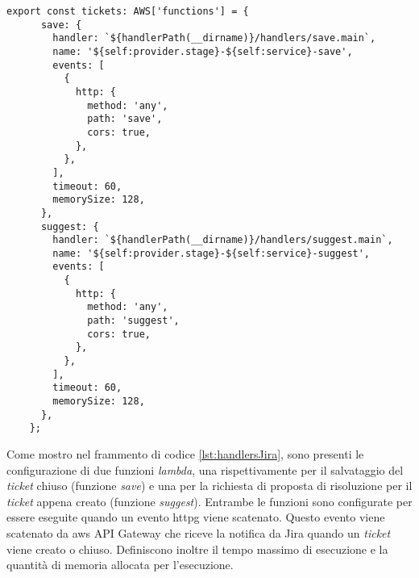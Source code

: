 \begin{lstlisting}[caption=Configurazione delle funzioni \textit{lambda} del sistema Jira in \textit{index.ts}, label=lst:handlersJira]
    export const tickets: AWS['functions'] = {
      save: {
        handler: `${handlerPath(__dirname)}/handlers/save.main`,
        name: '${self:provider.stage}-${self:service}-save',
        events: [
          {
            http: {
              method: 'any',
              path: 'save',
              cors: true,
            },
          },
        ],
        timeout: 60,
        memorySize: 128,
      },
      suggest: {
        handler: `${handlerPath(__dirname)}/handlers/suggest.main`,
        name: '${self:provider.stage}-${self:service}-suggest',
        events: [
          {
            http: {
              method: 'any',
              path: 'suggest',
              cors: true,
            },
          },
        ],
        timeout: 60,
        memorySize: 128,
      },
    };
\end{lstlisting}
Come mostro nel frammento di codice \ref{lst:handlersJira}, sono presenti le configurazione di due funzioni \textit{lambda}, una rispettivamente per il salvataggio del \textit{ticket} chiuso (funzione \textit{save}) e una per la richiesta di proposta di risoluzione per il \textit{ticket} appena creato (funzione \textit{suggest}).  Entrambe le funzioni sono configurate per essere eseguite quando un evento \gls{httpg} viene scatenato. Questo evento viene scatenato da \gls{aws} API Gateway che riceve la notifica da Jira quando un \textit{ticket} viene creato o chiuso.
Definiscono inoltre il tempo massimo di esecuzione e la quantità di memoria allocata per l'esecuzione.

